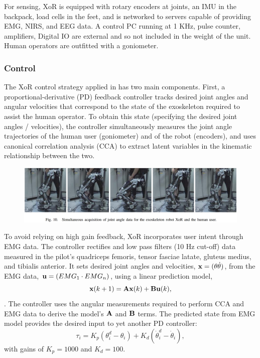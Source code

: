For sensing, XoR is equipped with rotary encoders at joints, an IMU in the backpack, load cells in the feet, and is networked to servers capable of providing EMG, NIRS, and EEG data.  A control PC running at 1 KHz, pulse counter, amplifiers, Digital IO are external and so not included in the weight of the unit.  Human operators are outfitted with a goniometer.


\subsubsection{Control}

The XoR control strategy applied in \cite{XoRkinemExtraction2012} has two main components.  First, a proportional-derivative (PD) feedback controller tracks desired joint angles and angular velocities that correspond to the state of the exoskeleton required to assist the human operator.  To obtain this state (specifying the desired joint angles / velocities), the controller simultaneously measures the joint angle trajectories of the human user (goniometer) and of the robot (encoders), and uses canonical correlation analysis (CCA) to extract latent variables in the kinematic relationship between the two.

\begin{figure}[ht]
  \centering
  \includegraphics[width=6.0in]{exos/figs/xor_joint_angles.png}
\end{figure}

To avoid relying on high gain feedback, XoR incorporates user intent through EMG data.  The controller rectifies and low pass filters (10 Hz cut-off) data measured in the pilot's quadriceps femoris, tensor fasciae latate, gluteus medius, and tibialis anterior. 
It sets desired joint angles and velocities, ${\bf x} = ({\bf \theta} \dot{\bf \theta})$, from the EMG data, ${\bf u} = (EMG_1 \cdot EMG_n)$, using a linear prediction model, 
\[{\bf x}(k+1) = {\bf A}{\bf x}(k)+{\bf B}{\bf u}(k),\].  
The controller uses the angular measurements required to perform CCA and EMG data to derive the model's ${\bf A}$ and ${\bf B}$ terms.  The predicted state from EMG model provides the desired input to yet another PD controller: 
\[\tau_i = K_p (\theta_i^d - \theta_i) + K_d (\dot\theta_i^d - \dot \theta_i),\] 
with gains of $K_p = 1000$ and $K_d = 100$.

